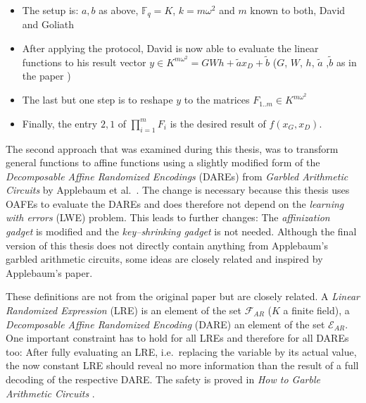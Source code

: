 \begin{itemize}

\item The setup is: $a, b$ as above, $\mathbb{F}_q = K$, $k = m\omega^2$ and $m$
known to both, David and Goliath

\item After applying the protocol, David is now able to evaluate the linear
functions to his result vector $y \in K^{m\omega^2} = GWh + \tilde{a}x_D +
\tilde{b}$ ($G$, $W$, $h$, $\tilde{a}$ ,$\tilde{b}$ as in the paper
\cite{davidgoliath})

\item The last but one step is to reshape $y$ to the matrices $F_{1..m}
\in K^{m\omega^2}$

\item Finally, the entry $2, 1$ of $\prod_{i=1}^m F_i$ is the desired result of
$f(x_G,x_D)$.

\end{itemize}


%
%
\label{sec:dare}

The second approach that was examined during this thesis, was to transform
general functions to affine functions using a slightly modified form of the
\emph{Decomposable Affine Randomized Encodings} (DAREs) from \emph{Garbled
Arithmetic Circuits} by Applebaum et al.\ \cite{gac2012}. The change is
necessary because this thesis uses OAFEs to evaluate the DAREs and does
therefore not depend on the \emph{learning with errors} (LWE) problem.  This
leads to further changes: The \emph{affinization gadget} \cite{gac2012} is
modified and the \emph{key--shrinking gadget} \cite{gac2012} is not needed.
Although the final version of this thesis does not directly contain anything
from Applebaum's garbled arithmetic circuits, some ideas are closely related and
inspired by Applebaum's paper.


\label{sec:affinization_definitions}

These definitions are not from the original paper but are closely related. A
\emph{Linear Randomized Expression} (LRE) is an element of the set
$\mathcal{F}_{AR}$ ($K$ a finite field), a \emph{Decomposable Affine Randomized
Encoding} (DARE) an element of the set $\mathcal{E}_{AR}$. One important
constraint has to hold for all LREs and therefore for all DAREs too: After fully
evaluating an LRE, i.e.\ replacing the variable by its actual value, the now
constant LRE should reveal no more information than the result of a full
decoding of the respective DARE. The safety is proved in \emph{How to Garble
Arithmetic Circuits} \cite{gac2012}.

